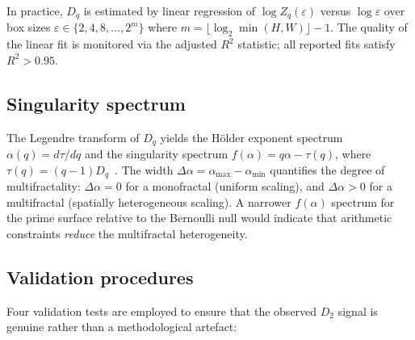 \documentclass[final,3p,times,twocolumn]{elsarticle}
\theoremstyle{definition}
\begin{document}
In practice, $D_q$ is estimated by linear regression of
$\log Z_q(\varepsilon)$ versus $\log \varepsilon$ over box sizes
$\varepsilon \in \{2, 4, 8, \ldots, 2^{m}\}$ where
$m = \lfloor \log_2 \min(H,W) \rfloor - 1$. The quality of the linear
fit is monitored via the adjusted $R^2$ statistic; all reported fits
satisfy $R^2 > 0.95$.

\subsection{Singularity spectrum}

The Legendre transform of $D_q$ yields the H\"older exponent spectrum
$\alpha(q) = d\tau/dq$ and the singularity spectrum
$f(\alpha) = q\alpha - \tau(q)$, where
$\tau(q) = (q-1)D_q$~\cite{HENTSCHEL-PROCACCIA-1983}. The width
$\Delta\alpha = \alpha_{\max} - \alpha_{\min}$ quantifies the degree of
multifractality: $\Delta\alpha = 0$ for a monofractal (uniform scaling),
and $\Delta\alpha > 0$ for a multifractal (spatially heterogeneous
scaling). A narrower $f(\alpha)$ spectrum for the prime surface relative
to the Bernoulli null would indicate that arithmetic constraints
\emph{reduce} the multifractal heterogeneity.

\subsection{Validation procedures}

Four validation tests are employed to ensure that the observed $D_2$
signal is genuine rather than a methodological artefact:
\end{document}

